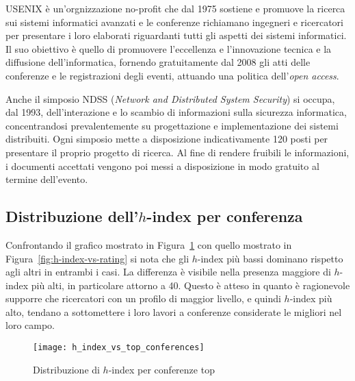 USENIX è un'orgnizzazione no-profit che dal 1975 sostiene e promuove la ricerca sui sistemi informatici avanzati e le conferenze richiamano ingegneri e ricercatori per presentare i loro elaborati riguardanti tutti gli aspetti dei sistemi informatici. Il suo obiettivo è quello di promuovere l'eccellenza e l'innovazione tecnica e la diffusione dell'informatica, fornendo gratuitamente dal 2008 gli atti delle conferenze e le registrazioni degli eventi, attuando una politica dell'\textit{open access}. 

Anche il simposio NDSS (\textit{Network and Distributed System Security}) si occupa, dal 1993, dell'interazione e lo scambio di informazioni sulla sicurezza informatica, concentrandosi prevalentemente su progettazione e implementazione dei sistemi distribuiti. Ogni simposio mette a disposizione indicativamente 120 posti per presentare il proprio progetto di ricerca. Al fine di rendere fruibili le informazioni, i documenti accettati vengono poi messi a disposizione in modo gratuito al termine dell'evento.

\subsection{Distribuzione dell'$h$-index per conferenza}

Confrontando il grafico mostrato in Figura~\ref{fig:h_index_vs_top_conferences} con quello mostrato in Figura~\ref{fig:h-index-vs-rating} si nota che gli $h$-index più bassi dominano rispetto agli altri in entrambi i casi. La differenza è visibile nella presenza maggiore di $h$-index più alti, in particolare attorno a 40.
Questo è atteso in quanto è ragionevole supporre che ricercatori con un profilo di maggior livello, e quindi $h$-index più alto, tendano a sottomettere i loro lavori a conferenze considerate le migliori nel loro campo.

\begin{figure}[tb]
  \texttt{[image: h\_index\_vs\_top\_conferences]}
  \caption{Distribuzione di $h$-index per conferenze top}
  \label{fig:h_index_vs_top_conferences}
\end{figure}